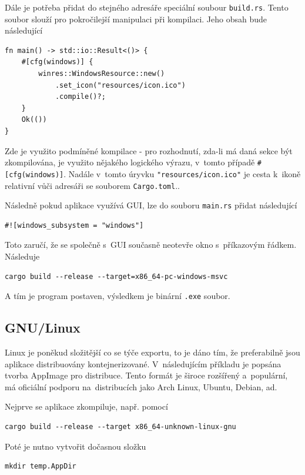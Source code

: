 \documentclass[a4paper, 12pt, twoside]{article} %
\newcommand{\rust}[1]{\texttt{#1}}
\begin{document}
		Dále je potřeba přidat do stejného adresáře speciální soubour \texttt{build.rs}. Tento soubor slouží pro pokročilejší manipulaci při kompilaci. Jeho obsah bude následující
		\begin{verbatim}
fn main() -> std::io::Result<()> {
	#[cfg(windows)] {
		winres::WindowsResource::new()
			.set_icon("resources/icon.ico")
			.compile()?;
	}
	Ok(())
}
		\end{verbatim}

		Zde je využito podmíněné kompilace - pro rozhodnutí, zda-li má daná sekce být zkompilována, je využito nějakého logického výrazu, v~tomto případě \texttt{#[cfg(windows)]}. Nadále v~tomto úryvku \rust{"resources/icon.ico"} je cesta k~ikoně relativní vůči adresáři se souborem \texttt{Cargo.toml}.\cite{comp_win_ico}.
		
		Následně pokud aplikace využívá GUI, lze do souboru \texttt{main.rs} přidat následující
		\begin{verbatim}
#![windows_subsystem = "windows"]
		\end{verbatim}
		
		Toto zaručí, že se společně s~GUI současně neotevře okno s~příkazovým řádkem. Následuje
		\begin{verbatim}
cargo build --release --target=x86_64-pc-windows-msvc
		\end{verbatim}
		
		A tím je program postaven, výsledkem je binární \texttt{.exe} soubor.\cite{winexport}


	\subsection{GNU/Linux}
		Linux je poněkud složitější co se týče exportu, to je dáno tím, že preferabilně jsou aplikace distribuovány kontejnerizované. V~následujícím příkladu je popsána tvorba AppImage pro distribuce. Tento formát je široce rozšířený a~populární, má oficiální podporu na~distribucích jako Arch Linux, Ubuntu, Debian, ad.\cite{appimage}

		Nejprve se aplikace zkompiluje, např. pomocí
		\begin{verbatim}
cargo build --release --target x86_64-unknown-linux-gnu
		\end{verbatim}

		Poté je nutno vytvořit dočasnou složku
		\begin{verbatim}
mkdir temp.AppDir
		\end{verbatim}
		
\end{document}
